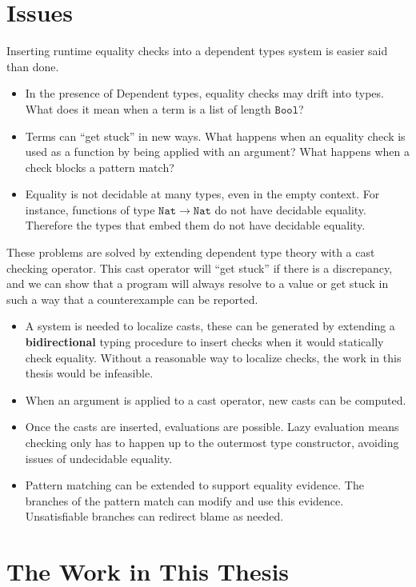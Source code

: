 \section{Issues}

Inserting runtime equality checks into a dependent types system is easier said than done.
\begin{itemize}
\item In the presence of Dependent types, equality checks may drift into types.
What does it mean when a term is a list of length $\mathtt{Bool}$?
\item Terms can ``get stuck'' in new ways. 
What happens when an equality check is used as a function by being applied with an argument?
What happens when a check blocks a pattern match?
\item Equality is not decidable at many types, even in the empty context.
For instance, functions of type $\mathtt{Nat}\rightarrow\mathtt{Nat}$ do not have decidable equality.
Therefore the types that embed them do not have decidable equality.
\end{itemize}
These problems are solved by extending dependent type theory with a cast checking operator.
This cast operator will ``get stuck'' if there is a discrepancy, and we can show that a program will always resolve to a value or get stuck in such a way that a counterexample can be reported.
\begin{itemize}
\item A system is needed to localize casts, these can be generated by extending a \textbf{bidirectional} typing procedure to insert checks when it would statically check equality.
Without a reasonable way to localize checks, the work in this thesis would be infeasible.
\item When an argument is applied to a cast operator, new casts can be computed. %
\item Once the casts are inserted, evaluations are possible.
Lazy evaluation means checking only has to happen up to the outermost type constructor, avoiding issues of undecidable equality.
\item Pattern matching can be extended to support equality evidence.
The branches of the pattern match can modify and use this evidence.
Unsatisfiable branches can redirect blame as needed.
\end{itemize}

\section{The Work in This Thesis}

